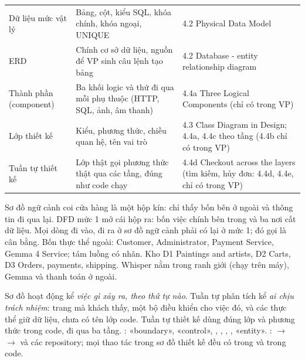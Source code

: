\begin{center}
\begin{longtable}{@{}P{3.7cm}P{6.3cm}P{5.9cm}@{}}
Dữ liệu mức vật lý & Bảng, cột, kiểu SQL, khóa chính, khóa ngoại, UNIQUE & 4.2 Physical Data Model\\
ERD & Chính cơ sở dữ liệu, nguồn để VP sinh câu lệnh tạo bảng & 4.2 Database - entity relationship diagram\\
Thành phần (component) & Ba khối logic và thứ đi qua mỗi phụ thuộc (HTTP, SQL, ảnh, âm thanh) & 4.4a Three Logical Components (chỉ có trong VP)\\
Lớp thiết kế & Kiểu, phương thức, chiều quan hệ, tên vai trò & 4.3 Class Diagram in Design; 4.4a, 4.4c theo tầng (4.4b chỉ có trong VP)\\
Tuần tự thiết kế & Lớp thật gọi phương thức thật qua các tầng, đúng như code chạy & 4.4d Checkout across the layers (tìm kiếm, hủy đơn: 4.4d, 4.4e, chỉ có trong VP)\\
\bottomrule
\end{longtable}
\end{center}

{Sơ đồ ngữ cảnh coi cửa hàng là một hộp kín: chỉ thấy bốn bên ở ngoài và thông tin đi qua lại. DFD mức 1 mở cái hộp ra: bốn việc chính bên trong và ba nơi cất dữ liệu. Mọi dòng đi vào, đi ra ở sơ đồ ngữ cảnh phải có lại ở mức 1; đó gọi là cân bằng.}
{Bốn thực thể ngoài: Customer, Administrator, Payment Service, Gemma 4 Service; tám luồng có nhãn. Kho D1 Paintings and artists, D2 Carts, D3 Orders, payments, shipping. Whisper nằm trong ranh giới (chạy trên máy), Gemma và thanh toán ở ngoài.}

{Sơ đồ hoạt động kể \emph{việc gì xảy ra, theo thứ tự nào}. Tuần tự phân tích kể \emph{ai chịu trách nhiệm}: trang mà khách thấy, một bộ điều khiển cho việc đó, và các thực thể giữ dữ liệu, chưa có tên lớp code. Tuần tự thiết kế dùng đúng lớp và phương thức trong code, đi qua ba tầng.}
{:  «boundary»,  «control», , , , ,  «entity». :  $\to$  $\to$  và các repository; mọi thao tác trong sơ đồ thiết kế đều có trong  và trong code.}

